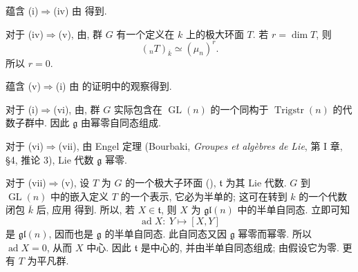 蕴含 (i)\(\Rightarrow\)(iv) 由 得到.

对于 (iv)\(\Rightarrow\)(v), 由,
群 \(G\) 有一个定义在 \(k\) 上的极大环面 \(T\). 若 \(r=\dim T\), 则
\[
  ({}_nT)_{\overline{k}}\simeq(\mu_n)^r.
\]
所以 \(r=0\).

蕴含 (v)\(\Rightarrow\)(i) 由 的证明中的观察得到.

对于 (i)\(\Rightarrow\)(vi), 由,
群 \(G\) 实际包含在 \(\operatorname{GL}(n)\) 的一个同构于 \(\operatorname{Trigstr}(n)\)
的代数子群中. 因此 \(\mathfrak g\) 由幂零自同态组成.

对于 (vi)\(\Rightarrow\)(vii), 由 Engel 定理
(Bourbaki, \emph{Groupes et algèbres de Lie}, 第 I 章, \S4, 推论 3), Lie 代数 \(\mathfrak g\) 幂零.

对于 (vii)\(\Rightarrow\)(v), 设 \(T\) 为 \(G\) 的一个极大子环面
(), \(\mathfrak t\) 为其 Lie 代数.
\(G\) 到 \(\operatorname{GL}(n)\) 中的嵌入定义 \(T\) 的一个表示,
它必为半单的; 这可在转到 \(k\) 的一个代数闭包 \(\overline{k}\) 后,
应用 得到.
所以, 若 \(X\in\mathfrak t\), 则 \(X\) 为 \(\mathfrak{gl}(n)\) 中的半单自同态.
立即可知
\[
  \operatorname{ad}X:\ Y\longmapsto[X,Y]
\]
是 \(\mathfrak{gl}(n)\), 因而也是 \(\mathfrak g\) 的半单自同态.
此自同态又因 \(\mathfrak g\) 幂零而幂零.
所以 \(\operatorname{ad}X=0\), 从而 \(X\) 中心.
因此 \(\mathfrak t\) 是中心的, 并由半单自同态组成; 由假设它为零.
更有 \(T\) 为平凡群.



